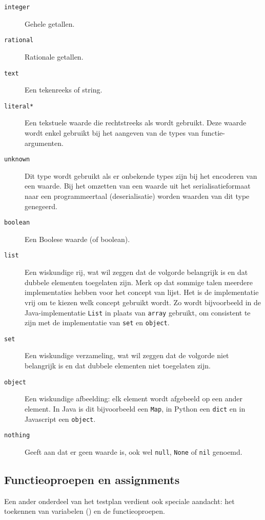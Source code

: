 \begin{description}
    \item[\texttt{integer}] Gehele getallen.
    \item[\texttt{rational}] Rationale getallen.
    \item[\texttt{text}] Een tekenreeks of string.
    \item[\texttt{literal*}] Een tekstuele waarde die rechtstreeks als  wordt gebruikt.
    Deze waarde wordt enkel gebruikt bij het aangeven van de types van functie-argumenten.
    \item[\texttt{unknown}] Dit type wordt gebruikt als er onbekende types zijn bij het encoderen van een waarde.
    Bij het omzetten van een waarde uit het serialisatieformaat naar een programmeertaal (deserialisatie) worden waarden van dit type genegeerd.
    \item[\texttt{boolean}] Een Boolese waarde (of boolean).
    \item[\texttt{list}] Een wiskundige rij, wat wil zeggen dat de volgorde belangrijk is en dat dubbele elementen toegelaten zijn.
    Merk op dat sommige talen meerdere implementaties hebben voor het concept van lijst.
    Het is de implementatie vrij om te kiezen welk concept gebruikt wordt.
    Zo wordt bijvoorbeeld in de Java-implementatie \texttt{List} in plaats van \texttt{array} gebruikt, om consistent te zijn met de implementatie van \texttt{set} en \texttt{object}.
    \item[\texttt{set}] Een wiskundige verzameling, wat wil zeggen dat de volgorde niet belangrijk is en dat dubbele elementen niet toegelaten zijn.
    \item[\texttt{object}] Een wiskundige afbeelding: elk element wordt afgebeeld op een ander element.
    In Java is dit bijvoorbeeld een \texttt{Map}, in Python een \texttt{dict} en in Javascript een \texttt{object}.
    \item[\texttt{nothing}] Geeft aan dat er geen waarde is, ook wel \texttt{null}, \texttt{None} of \texttt{nil} genoemd.
\end{description}

\subsection{Functieoproepen en assignments}\label{subsec:functieoproepen}

Een ander onderdeel van het testplan verdient ook speciale aandacht: het toekennen van variabelen () en de functieoproepen.

